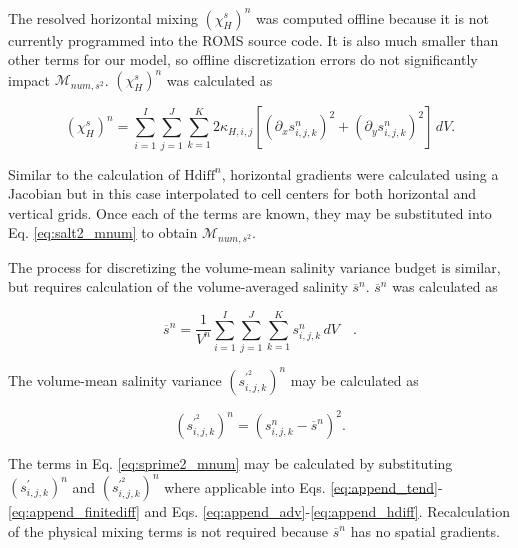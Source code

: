 \documentclass[draft]{agujournal2019}
\begin{document}
The resolved horizontal mixing $(\chi_H^s)^n$ was computed offline because it is not currently programmed into the ROMS source code. It is also much smaller than other terms for our model, so offline discretization errors do not significantly impact $\mathcal{M}_{num, s^2}$.  $(\chi_H^s)^n$ was calculated as
\begin{linenomath*}
    \begin{equation} \label{eq:append_hmix}
        (\chi_H^s)^n = \sum_{i=1}^{I}\sum_{j=1}^{J}\sum_{k=1}^{K} 2\kappa_{H,i,j} \left[ (\partial_x s_{i,j,k}^n)^2+(\partial_y s_{i,j,k}^n)^2 \right]  \, dV.
    \end{equation}
\end{linenomath*}
Similar to the calculation of $\mathrm{Hdiff}^n$, horizontal gradients were calculated using a Jacobian but in this case interpolated to cell centers for both horizontal and vertical grids. Once each of the terms are known, they may be substituted into Eq. \ref{eq:salt2_mnum} to obtain $\mathcal{M}_{num, s^2}$.

The process for discretizing the volume-mean salinity variance budget is similar, but requires calculation of the volume-averaged salinity $\overline{s}^n$. $\overline{s}^n$ was calculated as
\begin{linenomath*}
    \begin{equation}
        \overline{s}^n = \frac{1}{V^n} \sum_{i=1}^{I}\sum_{j=1}^{J}\sum_{k=1}^{K} s_{i,j,k}^n \, dV \quad .
    \end{equation}
\end{linenomath*}
The volume-mean salinity variance $(s_{i,j,k}^{{\prime^2}})^n$ may be calculated as
\begin{linenomath*}
    \begin{equation}
        (s_{i,j,k}^{{\prime^2}})^n = (s_{i,j,k}^n-\overline{s}^n)^2.
    \end{equation}
\end{linenomath*}
The terms in Eq. \ref{eq:sprime2_mnum} may be calculated by substituting $(s_{i,j,k}^{\prime})^n$ and $(s_{i,j,k}^{\prime^2})^n$ where applicable into Eqs. \ref{eq:append_tend}-\ref{eq:append_finitediff} and Eqs. \ref{eq:append_adv}-\ref{eq:append_hdiff}. Recalculation of the physical mixing terms is not required because $\overline{s}^n$ has no spatial gradients.
\end{document}
